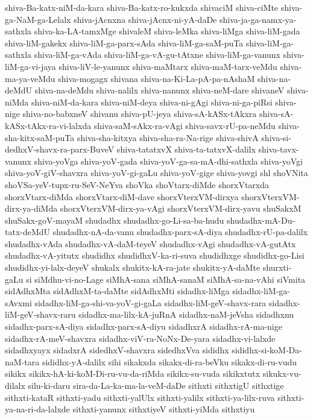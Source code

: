 {shiva-Ba-katx-niM-da-kara
shiva-Ba-katx-ro-kukxda
shivaciM
shiva-ciMte
shiva-ga-NaM-ga-Lelalx
shiva-jAcnxna
shiva-jAcnx-ni-yA-daDe
shiva-ja-ga-namx-ya-sathxla
shiva-ka-LA-tamxMge
shivaleM
shiva-leMka
shiva-liMga
shiva-liM-gada
shiva-liM-gakekx
shiva-liM-ga-parx-sAda
shiva-liM-ga-saM-puTa
shiva-liM-ga-sathxla
shiva-liM-ga-vAda
shiva-liM-ga-vA-gu-tAtxne
shiva-liM-ga-vanunx
shiva-liM-ga-vi-jaya
shiva-liV-le-yanunx
shiva-maMtarx
shiva-maM-tarx-veMdu
shiva-ma-ya-veMdu
shiva-mogagx
shivana
shiva-na-Ki-La-pA-pa-nAshaM
shiva-na-deMdU
shiva-na-deMdu
shiva-nalilx
shiva-nanunx
shiva-neM-dare
shivaneV
shiva-niMda
shiva-niM-da-kara
shiva-niM-deya
shiva-ni-gAgi
shiva-ni-ga-piRsi
shiva-nige
shiva-no-babxneV
shivanu
shiva-pU-jeya
shiva-sA-kASx-tAkxra
shiva-sA-kASx-tAkx-ra-vi-lalxda
shiva-saM-sAkx-ra-vAgi
shiva-savx-rU-pa-neMdu
shiva-sha-kitx-saM-puTa
shiva-sha-kitxya
shiva-sha-ra-Na-rige
shiva-shivA
shiva-si-dedhxV-shavx-ra-parx-BuveV
shiva-tatatxvX
shiva-ta-tatxvX-dalilx
shiva-tavx-vanunx
shiva-yoVga
shiva-yoV-gada
shiva-yoV-ga-sa-mA-dhi-sathxla
shiva-yoVgi
shiva-yoV-giV-shavxra
shiva-yoV-gi-gaLu
shiva-yoV-gige
shiva-yovgi
shl
shoVNita
shoVSa-yeV-tupx-ru-SeV-NeYva
shoVka
shoVtarx-diMde
shorxVtarxda
shorxVtarx-diMda
shorxVtarx-diM-dave
shorxVterxVM-dirxya
shorxVterxVM-dirx-ya-diMda
shorxVterxVM-dirx-ya-vAgi
shorxVterxVM-dirx-yavu
shuSakxM
shuSakx-goV-mayaM
shudadhx
shudadhx-go-Li-sa-ba-hudu
shudadhx-mA-Du-tatx-deMdU
shudadhx-nA-da-vanu
shudadhx-parx-sA-diya
shudadhx-rU-pa-dalilx
shudadhx-vAda
shudadhx-vA-daM-teyeV
shudadhx-vAgi
shudadhx-vA-gutAtx
shudadhx-vA-yitutx
shudidhx
shudidhxV-ka-ri-suva
shudidhxge
shudidhx-go-Lisi
shudidhx-yi-lalx-deyeV
shukalx
shukitx-kA-ra-jate
shukitx-yA-daMte
shurxti-gaLu
si
siMdhu-vi-no-Lage
siMhA-sana
siMhA-sanaM
siMhA-sa-na-vAhi
siVmita
sidAdhxMta
sidAdhxM-ta-daMte
sidAdhxMti
sidadhx-liMga
sidadhx-liM-ga-sAvxmi
sidadhx-liM-ga-shi-va-yoV-gi-gaLa
sidadhx-liM-geV-shavx-rara
sidadhx-liM-geV-shavx-raru
sidadhx-ma-lilx-kA-juRnA
sidadhx-naM-jeVsha
sidadhxnu
sidadhx-parx-sA-diya
sidadhx-parx-sA-diyu
sidadhxrA
sidadhx-rA-ma-nige
sidadhx-rA-meV-shavxra
sidadhx-viV-ra-NoNx-De-yara
sidadhx-vi-lalxde
sidadhxyayx
sidadxrA
sidedhxV-shavxra
sidedhxVva
sididhx
sididhx-si-koM-Da-naM-tara
sididhx-yA-dalilx
sihi
sikakxda
sikakx-di-ra-beVku
sikakx-di-ru-vudu
sikikx
sikikx-hA-ki-koM-Di-ru-vu-da-riMda
sikikx-su-vuda
sikikxtutx
sikukx-vu-dilalx
silu-ki-daru
sira-da-La-ka-ma-la-veM-daDe
sithxti
sithxtigU
sithxtige
sithxti-kataR
sithxti-yadu
sithxti-yalUlx
sithxti-yalilx
sithxti-ya-lilx-ruva
sithxti-ya-na-ri-da-lalxde
sithxti-yanunx
sithxtiyeV
sithxti-yiMda
sithxtiyu
}
